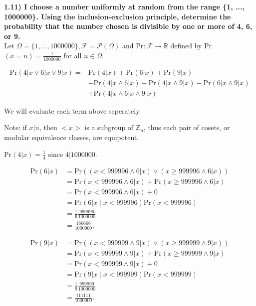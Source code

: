 \documentclass[letterpaper, 12pt]{article}
\begin{document}
	\noindent\textbf{1.11) I choose a number uniformly at random from the range \{1, ..., 1000000\}. Using the inclusion-exclusion principle, determine the probability that the number chosen is divisible by one or more of 4, 6, or 9.} \\
	Let $\Omega = \{1, \dots, 1000000\}, \mathcal{F}=\mathcal{P}(\Omega)$ and Pr$:\mathcal{F} \rightarrow \mathbb{R}$ defined by Pr$(x = n) = \frac{1}{1000000}$ for all $n\in\Omega$.

	\begin{align*}
		\text{Pr}( 4| x \lor 6| x \lor 9| x) = &\text{Pr}(4| x) + \text{Pr}(6| x) + \text{Pr}(9| x) \\
														&-\text{Pr}(4| x \land 6| x) -\text{Pr}(4| x \land 9| x) -\text{Pr}(6| x \land 9| x)\\
														&+\text{Pr}(4| x \land 6| x \land 9| x)
	\end{align*}
	
	We will evaluate each term above seperately.

	Note: if $x|n$, then $<x>$ is a subgroup of $\mathbb{Z}_n$, thus each pair of cosets, or modular equivalence classes, are equipotent.

	Pr$(4|x) = \frac{1}{4}$ since $4|1000000$.
	
	\begin{align*}
		\text{Pr}(6|x) &= \text{Pr}((x < 999996 \land 6|x) \lor (x \geq 999996 \land 6|x)) \\
		&= \text{Pr}(x < 999996 \land 6|x) + \text{Pr}(x \geq 999996 \land 6|x) \\
		&= \text{Pr}(x < 999996 \land 6|x) + 0 \\
		&= \text{Pr}( 6|x \mid x<999996)\text{Pr}(x < 999996) \\
		&= \frac{1}{6}\frac{999996}{1000000} \\
		&= \frac{166666}{1000000}.
	\end{align*}
		
	\begin{align*}
		\text{Pr}(9|x) &= \text{Pr}((x < 999999 \land 9|x) \lor (x \geq 999999 \land 9|x)) \\
		&= \text{Pr}(x < 999999 \land 9|x) + \text{Pr}(x \geq 999999 \land 9|x) \\
		&= \text{Pr}(x < 999999 \land 9|x) + 0 \\
		&= \text{Pr}( 9|x \mid x<999999)\text{Pr}(x < 999999) \\
		&= \frac{1}{9}\frac{999999}{1000000} \\
		&= \frac{111111}{1000000}.
	\end{align*}
\end{document}
